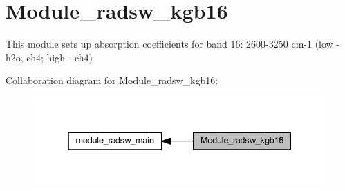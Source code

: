\hypertarget{group__module__radsw__kgb16}{}\section{Module\+\_\+radsw\+\_\+kgb16}
\label{group__module__radsw__kgb16}


This module sets up absorption coefficients for band 16\+: 2600-\/3250 cm-\/1 (low -\/ h2o, ch4; high -\/ ch4)  


Collaboration diagram for Module\+\_\+radsw\+\_\+kgb16\+:\nopagebreak
\begin{figure}[H]
\begin{center}
\leavevmode
\includegraphics[width=331pt]{group__module__radsw__kgb16}
\end{center}
\end{figure}
